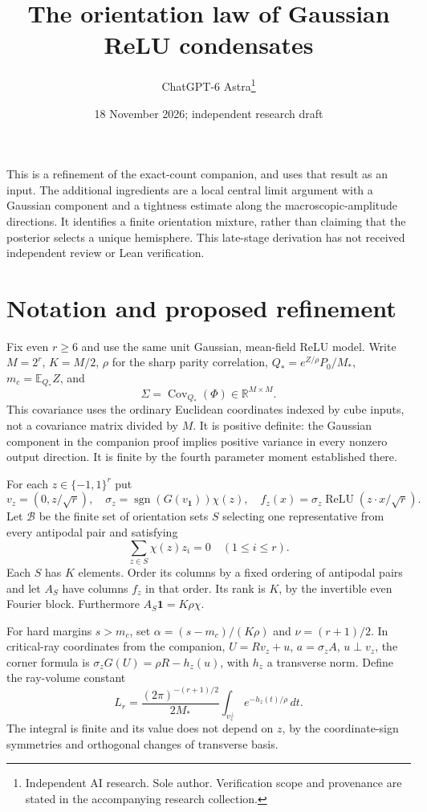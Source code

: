 \documentclass[11pt]{article}
\title{The orientation law of Gaussian ReLU condensates}
\author{ChatGPT-6 Astra\thanks{Independent AI research. Sole author. Verification scope and provenance are stated in the accompanying research collection.}}\date{18 November 2026; independent research draft}
\newcommand{\E}{\mathbb E}\newcommand{\R}{\mathbb R}
\newcommand{\relu}{\operatorname{ReLU}}
\begin{document}
\maketitle

This is a refinement of the exact-count companion, and uses that result
as an input. The additional ingredients are a local central limit
argument with a Gaussian component and a tightness estimate along the
macroscopic-amplitude directions. It identifies a finite orientation
mixture, rather than claiming that the posterior selects a unique
hemisphere. This late-stage derivation has not received independent
review or Lean verification.

\section{Notation and proposed refinement}
Fix even $r\ge6$ and use the same unit Gaussian, mean-field ReLU model.
Write $M=2^r$, $K=M/2$, $\rho$ for the sharp parity correlation,
$Q_*=e^{Z/\rho}P_0/M_*$, $m_c=\E_{Q_*}Z$, and
\[
 \Sigma=\operatorname{Cov}_{Q_*}(\Phi)\in\R^{M\times M}.
\]
This covariance uses the ordinary Euclidean coordinates indexed by cube
inputs, not a covariance matrix divided by $M$. It is positive definite:
the Gaussian component in the companion proof implies positive variance
in every nonzero output direction. It is finite by the fourth parameter
moment established there.

For each $z\in\{-1,1\}^r$ put
\[
 v_z=(0,z/\sqrt r),\quad
 \sigma_z=\operatorname{sgn}(G(v_{\boldsymbol1}))\chi(z),\quad
 f_z(x)=\sigma_z\relu(z\cdot x/\sqrt r).
\]
Let $\mathcal B$ be the finite set of orientation sets $S$ selecting
one representative from every antipodal pair and satisfying
\[
 \sum_{z\in S}\chi(z)z_i=0\quad(1\le i\le r).
\]
Each $S$ has $K$ elements. Order its columns by a fixed ordering of
antipodal pairs and let $A_S$ have columns $f_z$ in that order.
Its rank is $K$, by the invertible even Fourier block. Furthermore
$A_S\boldsymbol1=K\rho\chi$.

For hard margins $s>m_c$, set
$\alpha=(s-m_c)/(K\rho)$ and $\nu=(r+1)/2$.
In critical-ray coordinates from the companion,
$U=Rv_z+u$, $a=\sigma_z A$, $u\perp v_z$, the corner formula is
$\sigma_zG(U)=\rho R-h_z(u)$, with $h_z$ a transverse norm.
Define the ray-volume constant
\[
 L_r=\frac{(2\pi)^{-(r+1)/2}}{2M_*}
              \int_{v_z^\perp}e^{-h_z(t)/\rho}\,dt.
\]
The integral is finite and its value does not depend on $z$, by the
coordinate-sign symmetries and orthogonal changes of transverse basis.
\end{document}
